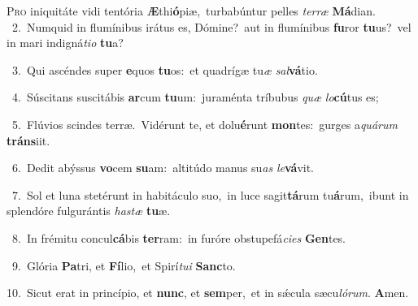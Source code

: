 \lettrine{\initial\textcolor{\initialcolor}{P}}{ro} iniquitáte vidi tentória \textbf{Æ}\-thi\-\textbf{ó}\-piæ,~\star turbabúntur pelles \textit{ter}\-\textit{ræ} \textbf{Má}\-dian.\\
{\numbfont\textcolor{\numbcolor}{~2.}}~Numquid in flumínibus irátus es, Dómine?~\dagger aut in flumínibus \textbf{fu}\-ror \textbf{tu}\-us?~\star vel in mari indigná\-\textit{ti}\-\textit{o} \textbf{tu}\-a?\par
{\numbfont\textcolor{\numbcolor}{~3.}}~Qui ascéndes super \textbf{e}\-quos \textbf{tu}\-os:~\star et quadrígæ tu\textit{æ} \textit{sal}\-\textbf{vá}tio.\par
{\numbfont\textcolor{\numbcolor}{~4.}}~Súscitans suscitábis \textbf{ar}\-cum \textbf{tu}\-um:~\star juraménta tríbubus \textit{quæ} \textit{lo}\-\textbf{cú}tus es;\par
{\numbfont\textcolor{\numbcolor}{~5.}}~Flúvios scindes terræ.~\dagger Vidérunt te, et dolu\-\textbf{é}\-runt \textbf{mon}\-tes:~\star gurges a\-\textit{quá}\-\textit{rum} \textbf{tráns}\-iit.\par
{\numbfont\textcolor{\numbcolor}{~6.}}~Dedit abýssus \textbf{vo}\-cem \textbf{su}\-am:~\star altitúdo manus su\textit{as} \textit{le}\-\textbf{vá}vit.\par
{\numbfont\textcolor{\numbcolor}{~7.}}~Sol et luna stetérunt in habitáculo suo,~\dagger in luce sagit\-\textbf{tá}\-rum tu\-\textbf{á}\-rum,~\star ibunt in splendóre fulgurántis \textit{has}\-\textit{tæ} \textbf{tu}\-æ.\par
{\numbfont\textcolor{\numbcolor}{~8.}}~In frémitu concul\-\textbf{cá}\-bis \textbf{ter}\-ram:~\star in furóre obstupefá\-\textit{ci}\-\textit{es} \textbf{Gen}\-tes.\par
{\numbfont\textcolor{\numbcolor}{~9.}}~Glória \textbf{Pa}\-tri, et \textbf{Fí}\-lio,~\star et Spirí\-\textit{tu}\-\textit{i} \textbf{Sanc}\-to.\par
{\numbfont\textcolor{\numbcolor}{10.}}~Sicut erat in princípio, et \textbf{nunc}\-, et \textbf{sem}\-per,~\star et in sǽcula sæcu\-\textit{ló}\-\textit{rum}. \textbf{A}\-men.\par

